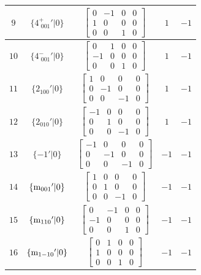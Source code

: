 \documentclass[fleqn,8pt]{jsarticle}
\begin{document}
\begin{longtable}{ccccc}
$ 9 $ & $ \{4^{+}_{\,\,001}{}'|0\} $ & $ \begin{bmatrix} 0 & -1 & 0 & 0 \\ 1 & 0 & 0 & 0 \\ 0 & 0 & 1 & 0 \end{bmatrix} $ & $ 1 $ & $ -1 $ \\ \hline
$ 10 $ & $ \{4^{-}_{\,\,001}{}'|0\} $ & $ \begin{bmatrix} 0 & 1 & 0 & 0 \\ -1 & 0 & 0 & 0 \\ 0 & 0 & 1 & 0 \end{bmatrix} $ & $ 1 $ & $ -1 $ \\ \hline
$ 11 $ & $ \{2{}_{100}{}'|0\} $ & $ \begin{bmatrix} 1 & 0 & 0 & 0 \\ 0 & -1 & 0 & 0 \\ 0 & 0 & -1 & 0 \end{bmatrix} $ & $ 1 $ & $ -1 $ \\ \hline
$ 12 $ & $ \{2{}_{010}{}'|0\} $ & $ \begin{bmatrix} -1 & 0 & 0 & 0 \\ 0 & 1 & 0 & 0 \\ 0 & 0 & -1 & 0 \end{bmatrix} $ & $ 1 $ & $ -1 $ \\ \hline
$ 13 $ & $ \{-1{}'|0\} $ & $ \begin{bmatrix} -1 & 0 & 0 & 0 \\ 0 & -1 & 0 & 0 \\ 0 & 0 & -1 & 0 \end{bmatrix} $ & $ -1 $ & $ -1 $ \\ \hline
$ 14 $ & $ \{{\rm m}_{001}{}'|0\} $ & $ \begin{bmatrix} 1 & 0 & 0 & 0 \\ 0 & 1 & 0 & 0 \\ 0 & 0 & -1 & 0 \end{bmatrix} $ & $ -1 $ & $ -1 $ \\ \hline
$ 15 $ & $ \{{\rm m}_{110}{}'|0\} $ & $ \begin{bmatrix} 0 & -1 & 0 & 0 \\ -1 & 0 & 0 & 0 \\ 0 & 0 & 1 & 0 \end{bmatrix} $ & $ -1 $ & $ -1 $ \\ \hline
$ 16 $ & $ \{{\rm m}_{1-10}{}'|0\} $ & $ \begin{bmatrix} 0 & 1 & 0 & 0 \\ 1 & 0 & 0 & 0 \\ 0 & 0 & 1 & 0 \end{bmatrix} $ & $ -1 $ & $ -1 $ \\ \hline

\end{longtable}
\end{document}

